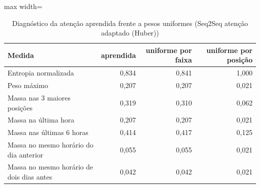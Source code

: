 \begin{table}[!htbp]
    \centering
    \caption{Diagnóstico da atenção aprendida frente a pesos uniformes (Seq2Seq atenção adaptado (Huber))}
    \label{tab:atencao_diag_seq2seq_attention_new__huber}
    \small
    \begin{adjustbox}{max width=\textwidth}
    \begin{tabular}{lrrr}
        \toprule
        Medida & aprendida & uniforme por faixa & uniforme por posição \\
        \midrule
        Entropia normalizada & 0,834 & 0,841 & 1,000 \\
        Peso máximo & 0,207 & 0,207 & 0,021 \\
        Massa nas 3 maiores posições & 0,319 & 0,310 & 0,062 \\
        Massa na última hora & 0,207 & 0,207 & 0,021 \\
        Massa nas últimas 6 horas & 0,414 & 0,417 & 0,125 \\
        Massa no mesmo horário do dia anterior & 0,055 & 0,055 & 0,021 \\
        Massa no mesmo horário de dois dias antes & 0,042 & 0,042 & 0,021 \\
        \bottomrule
    \end{tabular}
    \end{adjustbox}
\end{table}
